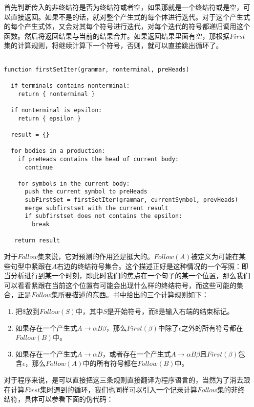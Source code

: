 首先判断传入的非终结符是否为终结符或者空，如果那就是一个终结符或是空，可以直接返回。如果不是的话，就对整个产生式的每个体进行迭代。对于这个产生式的每个产生式体，又会对其每个符号进行迭代，对每个迭代的符号都递归调用这个函数。然后将返回结果与当前的结果合并。如果返回结果里面有空，那根据$First$集的计算规则，将继续计算下一个符号，否则，就可以直接跳出循环了。

\begin{verbatim}

function firstSetIter(grammar, nonterminal, preHeads)

  if terminals contains nonterminal:
    return { nonterminal }

  if nonterminal is epsilon:
    return { epsilon }

  result = {}

  for bodies in a production:
    if preHeads contains the head of current body:
      continue
          
    for symbols in the current body:
      push the current symbol to preHeads
      subFirstSet = firstSetIter(grammar, currentSymbol, prevHeads)
      merge subfirstset with the current result
      if subfirstset does not contains the epsilon:
        break

   return result

\end{verbatim}

对于$Follow$集来说，它对预测的作用还是挺大的。$Follow(A)$被定义为可能在某些句型中紧跟在$A$右边的终结符号集合。这个描述正好是这种情况的一个写照：即当分析进行到某一个时刻，即此时我们的焦点在一个句子的某一个位置，那么我们可以看看紧跟在当前这个位置有可能会出现什么样的终结符号，而这些可能的集合，正是$Follow$集所要描述的东西。书中给出的三个计算规则如下：

\begin{enumerate}
    \item 把\$放到$Follow(S)$中，其中$S$是开始符号，而\$是输入右端的结束标记。
    \item 如果存在一个产生式$A \rightarrow \alpha B \beta$，那么$First(\beta)$中除了$\epsilon$之外的所有符号都在$Follow(B)$中。
    \item 如果存在一个产生式$A \rightarrow \alpha B$，或者存在一个产生式$A \rightarrow \alpha B \beta$且$First(\beta)$包含$\epsilon$，那么$Follow(A)$中的所有符号都在$Follow(B)$中。
\end{enumerate}

对于程序来说，是可以直接把这三条规则直接翻译为程序语言的，当然为了消去跟在计算$First$集时遇到的循环，我们也同样可以引入一个记录计算$Follow$集的非终结符，具体可以参看下面的伪代码：

